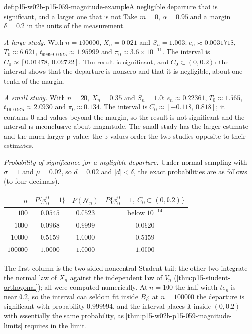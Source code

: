 \begin{hbexample}{def:p15-w02b-p15-059-magnitude-example}{A negligible departure that is significant, and a larger one that is not}
Take \(m=0\), \(\alpha=0.95\) and a margin \(\delta=0.2\) in the units of
the measurement.

\emph{A large study.} With \(n=100000\), \(\bar X_n=0.021\) and
\(S_n=1.003\): \(e_n\approx0.0031718\), \(T_0\approx6.621\),
\(t_{99999,0.975}\approx1.95999\) and \(\pi_0\approx3.6\times10^{-11}\).
The interval is \(C_0\approx[0.01478,\,0.02722]\). The result is
significant, and \(C_0\subset(0,0.2)\): the interval shows that the
departure is nonzero and that it is negligible, about one tenth of the
margin.

\emph{A small study.} With \(n=20\), \(\bar X_n=0.35\) and \(S_n=1.0\):
\(e_n\approx0.22361\), \(T_0\approx1.565\), \(t_{19,0.975}\approx2.0930\)
and \(\pi_0\approx0.134\). The interval is
\(C_0\approx[-0.118,\,0.818]\); it contains \(0\) and values beyond the
margin, so the result is not significant and the interval is inconclusive
about magnitude. The small study has the larger estimate and the much
larger p-value: the p-values order the two studies opposite to their
estimates.

\emph{Probability of significance for a negligible departure.} Under
normal sampling with \(\sigma=1\) and \(\mu=0.02\), so \(d=0.02\) and
\(|d|<\delta\), the exact probabilities are as follows (to four
decimals).
\begin{center}
\begin{tabular}{rccc}
\(n\) & \(P\{\phi_0^0=1\}\) & \(P(\mathcal N_n)\) & \(P\{\phi_0^0=1,\ C_0\subset(0,0.2)\}\)\\
\hline
\(100\) & \(0.0545\) & \(0.0523\) & below \(10^{-14}\)\\
\(1000\) & \(0.0968\) & \(0.9999\) & \(0.0920\)\\
\(10000\) & \(0.5159\) & \(1.0000\) & \(0.5159\)\\
\(100000\) & \(1.0000\) & \(1.0000\) & \(1.0000\)\\
\end{tabular}
\end{center}
The first column is the two-sided noncentral Student tail; the other two
integrate the normal law of \(\bar X_n\) against the independent law of
\(V_n\) (\cref{thm:p15-student-orthogonal}); all were computed numerically.
At \(n=100\) the half-width \(te_n\) is near \(0.2\), so the interval can
seldom fit inside \(B_\delta\); at \(n=100000\) the departure is significant
with probability \(0.999994\), and the interval places it inside
\((0,0.2)\) with essentially the same probability, as
\cref{thm:p15-w02b-p15-059-magnitude-limits} requires in the limit.


\end{hbexample}
